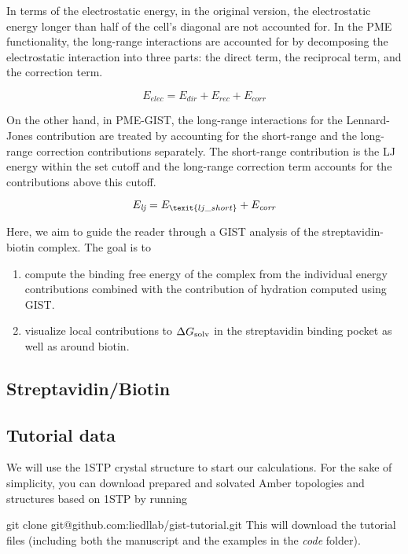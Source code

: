 \documentclass[9pt,tutorial]{livecoms}
\newcommand{\dgsolv}{\Delta G_\textup{solv}}
\newcommand{\software}{\emph}
\newenvironment{code}{\par \noindent \ttfamily}{}
\begin{document}
In terms of the electrostatic energy, in the original version, the electrostatic energy longer than half of the cell's diagonal are not accounted for. In the PME functionality, the long-range interactions are accounted for by decomposing the electrostatic interaction into three parts: the direct term, the reciprocal term, and the correction term. 

\begin{equation}
	E_\textit{elec} = E_\textit{dir} + E_\textit{rec} + E_\textit{corr}
\end{equation}

On the other hand, in PME-GIST, the long-range interactions for the Lennard-Jones contribution are treated by accounting for the short-range and the long-range correction contributions separately. The short-range contribution is the LJ energy within the set cutoff and the long-range correction term accounts for the contributions above this cutoff.

\begin{equation}
	E_\textit{lj} = E_\texit{lj\_short} +  E_\textit{corr}
\end{equation}

Here, we aim to guide the reader through a GIST analysis of the streptavidin-biotin complex. The goal is to
\begin{enumerate}
	\item compute the binding free energy of the complex from the individual energy contributions combined with the contribution of hydration computed using GIST.
	\item visualize local contributions to $\dgsolv$ in the streptavidin binding pocket as well as around biotin.
\end{enumerate}

\subsection{Streptavidin/Biotin}
\subsection{Tutorial data}
We will use the 1STP crystal structure to start our calculations.
For the sake of simplicity, you can download prepared and solvated Amber topologies and structures based on 1STP by running
\begin{code}
git clone git@github.com:liedllab/gist-tutorial.git
\end{code}
This will download the tutorial files (including both the manuscript and the examples in the \software{code} folder).
\end{document}
